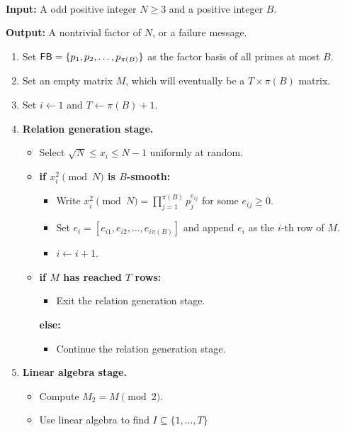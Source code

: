 \begin{algo}~

    {\bf Input:} A odd positive integer $N \geq 3$ and a positive integer $B$. 
    
    {\bf Output:} A nontrivial factor of $N$, or a failure message.
    \begin{enumerate}
        \item Set ${\sf FB} = \{p_1, p_2, \dots, p_{\pi(B)}\}$ as the factor 
        basis of all primes at most $B$. 
        \item Set an empty matrix $M$, which will eventually be a $T \times 
        \pi(B)$ matrix. 
        \item Set $i \gets 1$ and $T \gets \pi(B) + 1$. 
        \item {\bf Relation generation stage.}
        \begin{itemize}
            \item Select $\sqrt{N} \leq x_i \leq N-1$ uniformly at random. 
            \item {\bf if $x_i^2 \pmod N$ is $B$-smooth:}
            \begin{itemize}[$\circ$]
                \item Write $x_i^2 \pmod N = \prod_{j=1}^{\pi(B)} p_j^{e_{ij}}$ 
                for some $e_{ij} \geq 0$. 
                \item Set $e_i = [e_{i1}, e_{i2}, \dots, e_{i\pi(B)}]$ and append 
                $e_i$ as the $i$-th row of $M$.
                \item $i \gets i+1$.
            \end{itemize}
            \item {\bf if $M$ has reached $T$ rows:}
            \begin{itemize}[$\circ$]
                \item Exit the relation generation stage.
            \end{itemize}
            {\bf else:}
            \begin{itemize}[$\circ$]
                \item Continue the relation generation stage. 
            \end{itemize}
        \end{itemize}
        \item {\bf Linear algebra stage.}
        \begin{itemize}
            \item Compute $M_2 = M \pmod 2$. 
            \item Use linear algebra to find $I \subseteq \{1, \dots, T\}$ 

\end{itemize}
\end{enumerate}
\end{algo}
